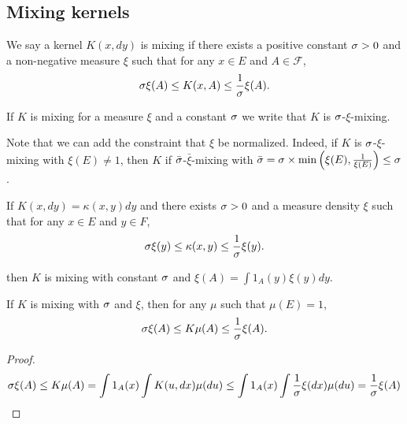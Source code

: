 \subsection{Mixing kernels}
\begin{definition}
    We say a kernel $K(x, dy)$ is mixing if there exists a positive constant $\sigma > 0$ and a non-negative measure $\xi$ such that for any $x\in E$ and $A\in\mathcal F$,
    \begin{equation}
        \sigma\xi(A) \leq K(x, A) \leq \frac{1}{\sigma}\xi(A).
    \end{equation}
\end{definition}
If $K$ is mixing for a measure $\xi$ and a constant $\sigma$ we write that $K$ is $\sigma$-$\xi$-mixing.

\begin{remark}
    Note that we can add the constraint that $\xi$ be normalized. Indeed, if $K$ is $\sigma$-$\xi$-mixing with $\xi(E)\neq 1$, then $K$ if $\bar {\sigma}$-$\bar\xi$-mixing with $\bar{\sigma} = \sigma \times \min\left(\xi(E), \frac{1}{\xi(E)}\right)\leq \sigma$.
\end{remark}

\begin{proposition}
    If $K(x, dy) = \kappa(x, y)dy$ and there exists $\sigma >0$ and a measure density $\xi$ such that for any $x\in E$ and $y\in F$,
    \begin{equation}
        \sigma\xi(y) \leq \kappa(x, y) \leq \frac{1}{\sigma}\xi(y).
    \end{equation}

    then $K$ is mixing with constant $\sigma$ and $\xi(A)=\int 1_A(y)\xi(y)dy$.
\end{proposition}

\begin{proposition}
    If $K$ is mixing with $\sigma$ and $\xi$, then for any $\mu$ such that $\mu(E)=1$,
    \begin{equation}
        \sigma\xi(A)\leq K\mu(A)\leq \frac{1}{\sigma}\xi(A).
    \end{equation}
\end{proposition}
\begin{proof}
    \begin{equation}
    \sigma\xi(A)\leq K\mu(A)=\int 1_A(x)\int K(u, dx)\mu(du) \leq \int 1_A(x)\int \frac{1}{\sigma}\xi(dx)\mu(du)=\frac{1}{\sigma}\xi(A)
    \end{equation}
\end{proof}


